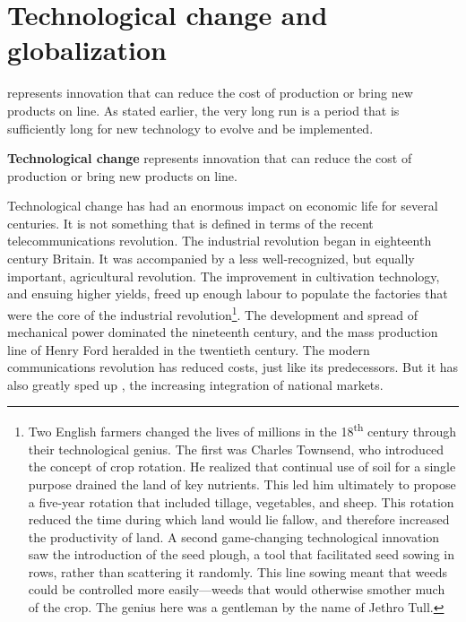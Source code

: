\section{Technological change and globalization}\label{sec:ch8sec7}

 represents innovation that can reduce the cost of production or bring new products on line. As stated earlier, the very long run is a period that is sufficiently long for new technology to evolve and be implemented.

\begin{DefBox}
\textbf{Technological change} represents innovation that can reduce the cost of production or bring new products on line.
\end{DefBox}

Technological change has had an enormous impact on economic life for several centuries. It is not something that is defined in terms of the recent telecommunications revolution. The industrial revolution began in eighteenth century Britain. It was accompanied by a less well-recognized, but equally important, agricultural revolution. The improvement in cultivation technology, and ensuing higher yields, freed up enough labour to populate the factories that were the core of the industrial revolution\footnote{Two English farmers changed the lives of millions in the 18\textsuperscript{th} century through their technological genius. The first was Charles Townsend, who introduced the concept of crop rotation. He realized that continual use of soil for a single purpose drained the land of key nutrients. This led him ultimately to propose a five-year rotation that included tillage, vegetables, and sheep. This rotation reduced the time during which land would lie fallow, and therefore increased the productivity of land. A second game-changing technological innovation saw the introduction of the seed plough, a tool that facilitated seed sowing in rows, rather than scattering it randomly. This line sowing meant that weeds could be controlled more easily---weeds that would otherwise smother much of the crop. The genius here was a gentleman by the name of Jethro Tull.}. The development and spread of mechanical power dominated the nineteenth century, and the mass production line of Henry Ford heralded in the twentieth century. The modern communications revolution has reduced costs, just like its predecessors. But it has also greatly sped up , the increasing integration of national markets.

